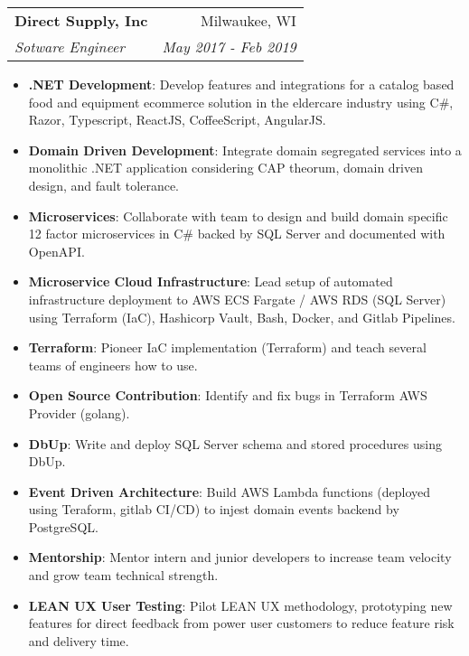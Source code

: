 \documentclass[letterpaper,11pt]{article}
\makeatletter
\newcommand{\resumeItem}[2]{
  \item\small{
    \textbf{#1}{: #2 \vspace{-2pt}}
  }
}
\newcommand{\resumeSubheading}[4]{
  \vspace{-1pt}\item
    \begin{tabular*}{0.97\textwidth}{l@{\extracolsep{\fill}}r}
      \textbf{#1} & #2 \\
      \textit{\small#3} & \textit{\small #4} \\
    \end{tabular*}\vspace{-5pt}
}
\newcommand{\resumeItemListStart}{\begin{itemize}}
\newcommand{\resumeItemListEnd}{\end{itemize}\vspace{-5pt}}
\makeatother
\begin{document}
    \resumeSubheading
      {Direct Supply, Inc}{Milwaukee, WI}
      {Sotware Engineer}{May 2017 - Feb 2019}
      \resumeItemListStart
        \resumeItem{.NET Development}
          {Develop features and integrations for a catalog based food and equipment ecommerce solution in the eldercare industry using C\#, Razor, Typescript, ReactJS, CoffeeScript, AngularJS.}
        \resumeItem{Domain Driven Development}
          {Integrate domain segregated services into a monolithic .NET application considering CAP theorum, domain driven design, and fault tolerance.}
        \resumeItem{Microservices}
          {Collaborate with team to design and build domain specific 12 factor microservices in C\# backed by SQL Server and documented with OpenAPI.}
        \resumeItem{Microservice Cloud Infrastructure}
          {Lead setup of automated infrastructure deployment to AWS ECS Fargate / AWS RDS (SQL Server) using Terraform (IaC), Hashicorp Vault, Bash, Docker, and Gitlab Pipelines.}
        \resumeItem{Terraform}
          {Pioneer IaC implementation (Terraform) and teach several teams of engineers how to use.}
        \resumeItem{Open Source Contribution}
          {Identify and fix bugs in Terraform AWS Provider (golang).}
        \resumeItem{DbUp}
          {Write and deploy SQL Server schema and stored procedures using DbUp.}
        \resumeItem{Event Driven Architecture}
          {Build AWS Lambda functions (deployed using Teraform, gitlab CI/CD) to injest domain events backend by PostgreSQL.}
        \resumeItem{Mentorship}
          {Mentor intern and junior developers to increase team velocity and grow team technical strength.}
        \resumeItem{LEAN UX User Testing}
          {Pilot LEAN UX methodology, prototyping new features for direct feedback from power user customers to reduce feature risk and delivery time.}

      \resumeItemListEnd
\end{document}
